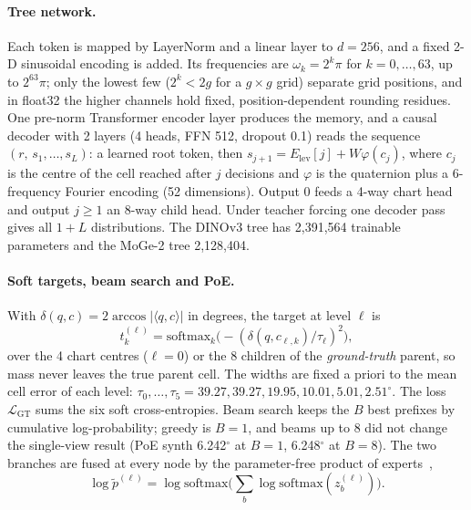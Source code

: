 \paragraph{Tree network.}
Each token is mapped by LayerNorm and a linear layer to $d=256$, and a fixed 2-D sinusoidal encoding is added. Its frequencies are $\omega_k=2^k\pi$ for $k=0,\dots,63$, \ie up to $2^{63}\pi$; only the lowest few ($2^k<2g$ for a $g\times g$ grid) separate grid positions, and in float32 the higher channels hold fixed, position-dependent rounding residues. One pre-norm Transformer encoder layer produces the memory, and a causal decoder with 2 layers (4 heads, FFN 512, dropout 0.1) reads the sequence $(r,\,s_1,\dots,s_L)$: a learned root token, then $s_{j+1}=E_{\text{lev}}[j]+W\varphi(c_j)$, where $c_j$ is the centre of the cell reached after $j$ decisions and $\varphi$ is the quaternion plus a 6-frequency Fourier encoding (52 dimensions). Output 0 feeds a 4-way chart head and output $j\ge1$ an 8-way child head. Under teacher forcing one decoder pass gives all $1+L$ distributions. The DINOv3 tree has 2,391,564 trainable parameters and the MoGe-2 tree 2,128,404.

\paragraph{Soft targets, beam search and PoE.}
With $\delta(q,c)=2\arccos|\langle q,c\rangle|$ in degrees, the target at level $\ell$ is
\begin{equation}
  t^{(\ell)}_k=\mathrm{softmax}_k\big(-(\delta(q,c_{\ell,k})/\tau_\ell)^2\big),
\end{equation}
over the 4 chart centres ($\ell=0$) or the 8 children of the \emph{ground-truth} parent, so mass never leaves the true parent cell. The widths are fixed a priori to the mean cell error of each level: $\tau_0,\dots,\tau_5=39.27, 39.27, 19.95, 10.01, 5.01, 2.51^\circ$. The loss $\mathcal{L}_{\text{GT}}$ sums the six soft cross-entropies. Beam search keeps the $B$ best prefixes by cumulative log-probability; greedy is $B=1$, and beams up to 8 did not change the single-view result (PoE synth 6.242$^\circ$ at $B{=}1$, 6.248$^\circ$ at $B{=}8$). The two branches are fused at every node by the parameter-free product of experts~\cite{hinton2002poe},
\begin{equation}
  \log\tilde p^{(\ell)}=\log\mathrm{softmax}\Big(\textstyle\sum_{b}\log\mathrm{softmax}(z_b^{(\ell)})\Big).
\end{equation}

